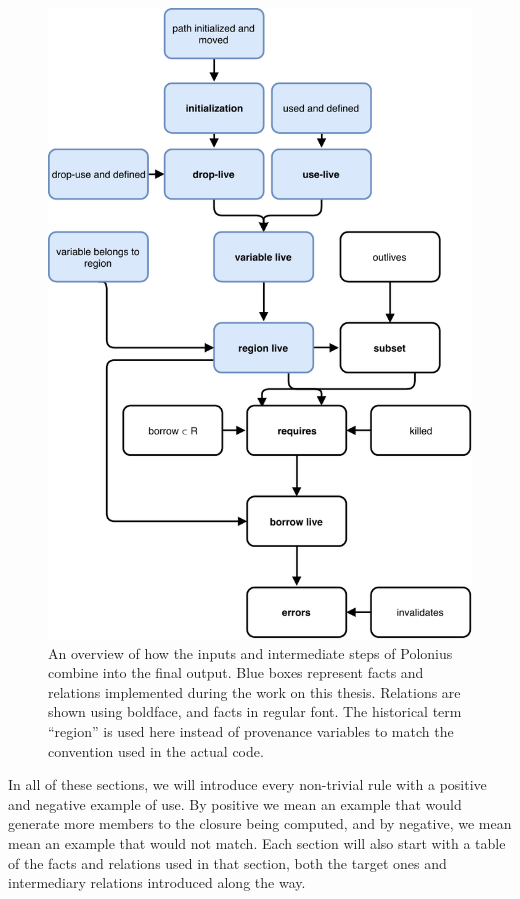 \documentclass[11pt,a4paper,twoside,openany,draft]{report}
\begin{document}
\begin{figure}
  \includegraphics[width=0.9\linewidth]{Graphs/polonius-overview}
  \caption[Flowchart of the Polonius Inputs and Outputs]{An overview of how the
    inputs and intermediate steps of Polonius combine into the final output.
    Blue boxes represent facts and relations implemented during the work on this
    thesis. Relations are shown using boldface, and facts in regular font. The
    historical term ``region'' is used here instead of provenance variables to
    match the convention used in the actual code.}\label{fig:polonius-overview}
\end{figure}

In all of these sections, we will introduce every non-trivial rule with a
positive and negative example of use. By positive we mean an example that would
generate more members to the closure being computed, and by negative, we mean
mean an example that would not match. Each section will also start with a table
of the facts and relations used in that section, both the target ones and
intermediary relations introduced along the way.
\end{document}
